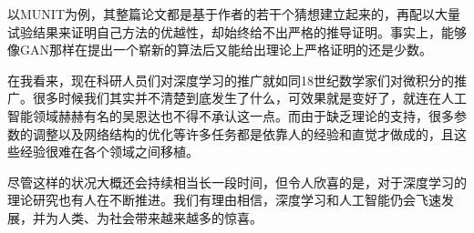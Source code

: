 \documentclass[UTF8,a4paper]{ctexart}
\begin{document}
\begin{multicols}{2}
		\indent 以MUNIT\cite{huang2018munit}为例，其整篇论文都是基于作者的若干个猜想建立起来的，再配以大量试验结果来证明自己方法的优越性，却始终给不出严格的推导证明。事实上，能够像GAN\cite{Goodfellow2014Generative}那样在提出一个崭新的算法后又能给出理论上严格证明的还是少数。
		
		\indent 在我看来，现在科研人员们对深度学习的推广就如同18世纪数学家们对微积分的推广。很多时候我们其实并不清楚到底发生了什么，可效果就是变好了，就连在人工智能领域赫赫有名的吴恩达也不得不承认这一点。而由于缺乏理论的支持，很多参数的调整以及网络结构的优化等许多任务都是依靠人的经验和直觉才做成的，且这些经验很难在各个领域之间移植。
		
		\indent 尽管这样的状况大概还会持续相当长一段时间，但令人欣喜的是，对于深度学习的理论研究也有人在不断推进。我们有理由相信，深度学习和人工智能仍会飞速发展，并为人类、为社会带来越来越多的惊喜。
		


\end{multicols}

\newpage

\begin{multicols}{2}

\end{multicols}
\end{document}
